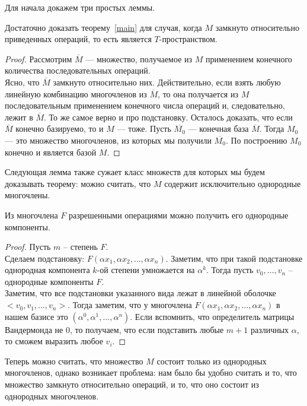 Для начала докажем три простых леммы.\vskip 0.1in\noindent
\begin{lemma}
    \label{closure}
    Достаточно доказать теорему~\ref{main} для случая, когда $M$ замкнуто относительно приведенных операций, то есть является $T$-пространством.
\end{lemma}
\begin{proof}
    Рассмотрим $\overline{M}$ --- множество, получаемое из $M$ применением конечного количества последовательных операций.\\
    Ясно, что $\overline{M}$ замкнуто относительно них.
    Действительно, если взять любую линейную комбинацию многочленов из $\overline{M}$, то она получается из $M$ последовательным применением конечного числа операций и, следовательно, лежит в $\overline{M}$.
    То же самое верно и про подстановку.
    Осталось доказать, что если $\overline{M}$ конечно базируемо, то и $M$ --- тоже.
    Пусть $\overline{M_0}$ --- конечная база $\overline{M}$.
    Тогда $M_0$ --- это множество многочленов, из которых мы получили $\overline{M_0}$.
    По построению $M_0$ конечно и является базой $M$.
\end{proof}
Следующая лемма также сужает класс множеств для которых мы будем доказывать теорему: можно считать, что $M$ содержит исключительно однородные многочлены.\vskip 0.1in\noindent
\begin{lemma}
    \label{homogen}
    Из многочлена $F$ разрешенными операциями можно получить его однородные компоненты.
\end{lemma}
\begin{proof}
    Пусть $m$ -- степень $F$.\\
    Сделаем подстановку: $F(\alpha x_1, \alpha x_2, \ldots, \alpha x_n)$.
    Заметим, что при такой подстановке однородная компонента $k$-ой степени умножается на $\alpha^k$.
    Тогда пусть $v_0,\ldots,v_n$ -- однородные компоненты $F$. \\
    Заметим, что все подстановки указанного вида лежат в линейной оболочке $<v_0,v_1,\ldots,v_n>$.
    Тогда заметим, что у многочлена $F(\alpha x_1, \alpha x_2, \ldots, \alpha x_n)$ в нашем базисе это $(\alpha^0,\alpha^1,\ldots,\alpha^n)$.
    Если вспомнить, что определитель матрицы Вандермонда не $0$, то получаем, что если подставить любые $m+1$ различных $\alpha$, то сможем выразить любое $v_i$.
\end{proof}
Теперь можно считать, что множество $M$ состоит только из однородных многочленов, однако возникает проблема: нам было бы удобно считать и то, что множество замкнуто относительно операций, и то, что оно состоит из однородных многочленов.
